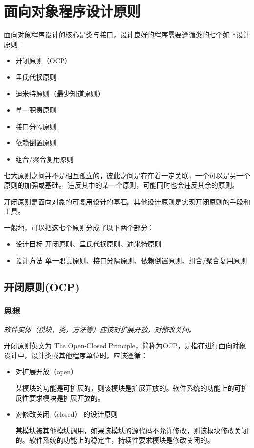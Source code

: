 
\chapter{面向对象程序设计原则}

面向对象程序设计的核心是类与接口，设计良好的程序需要遵循类的七个如下设计原则：

\begin{itemize}
	\item 开闭原则（OCP）
	\item 里氏代换原则
	\item 迪米特原则（最少知道原则）
	\item 单一职责原则
	\item 接口分隔原则
	\item 依赖倒置原则
	\item 组合/聚合复用原则
\end{itemize}

七大原则之间并不是相互孤立的，彼此之间是存在着一定关联，一个可以是另一个原则的加强或基础。
违反其中的某一个原则，可能同时也会违反其余的原则。

开闭原则是面向对象的可复用设计的基石。其他设计原则是实现开闭原则的手段和工具。

一般地，可以把这七个原则分成了以下两个部分：
\begin{itemize}
	\item 设计目标
	开闭原则、里氏代换原则、迪米特原则
	\item 设计方法
	单一职责原则、接口分隔原则、依赖倒置原则、组合/聚合复用原则
\end{itemize}


\section{开闭原则(OCP)}

\subsection{思想}
\emph{ 软件实体（模块，类，方法等）应该对扩展开放，对修改关闭。}

开闭原则英文为 The Open-Closed Principle，简称为OCP，是指在进行面向对象设计中，设计类或其他程序单位时，应该遵循：

\begin{itemize}

    \item 对扩展开放（open）

	某模块的功能是可扩展的，则该模块是扩展开放的。软件系统的功能上的可扩展性要求模块是扩展开放的。
    
    \item 对修改关闭（closed） 的设计原则

	某模块被其他模块调用，如果该模块的源代码不允许修改，则该模块修改关闭的。软件系统的功能上的稳定性，持续性要求模块是修改关闭的。

\end{itemize}

